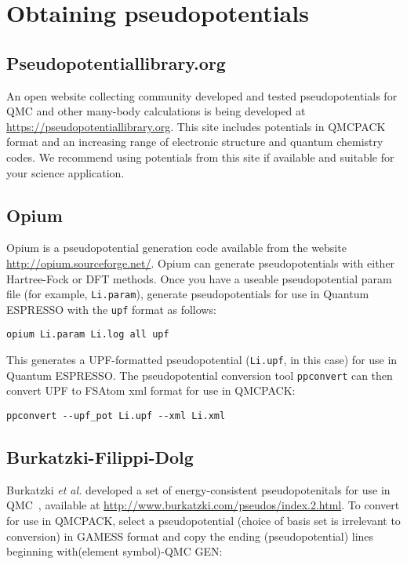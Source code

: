 \section{Obtaining pseudopotentials}

\subsection{Pseudopotentiallibrary.org}

An open website collecting community developed and tested
pseudopotentials for QMC and other many-body calculations is being
developed at \url{https://pseudopotentiallibrary.org}. This site
includes potentials in QMCPACK format and an increasing range of
electronic structure and quantum chemistry codes. We recommend using
potentials from this site if available and suitable for your science
application.

\subsection{Opium}
\label{subsec:opium}

Opium is a pseudopotential generation code available from the website \url{http://opium.sourceforge.net/}.  Opium can generate pseudopotentials with either Hartree-Fock or DFT methods.  Once you have a useable pseudopotential param file (for example, \texttt{Li.param}), generate pseudopotentials for use in Quantum ESPRESSO with the \texttt{upf} format as follows:
\begin{lstlisting}[caption=Generate UPF-formatted pseudopotential with Opium]
opium Li.param Li.log all upf
\end{lstlisting}
This generates a UPF-formatted pseudopotential (\texttt{Li.upf}, in this case) for use in Quantum ESPRESSO.  The pseudopotential conversion tool \texttt{ppconvert} can then convert UPF to FSAtom xml format for use in QMCPACK:
\begin{lstlisting}[caption=Convert UPF-formatted pseudopotential to FSAtom xml format]
ppconvert --upf_pot Li.upf --xml Li.xml
\end{lstlisting}

\subsection{Burkatzki-Filippi-Dolg}
\label{subsec:BFD}

Burkatzki \textit{et al.} developed a set of energy-consistent pseudopotenitals for use in QMC~\cite{Burkatzki07,Burkatzki08}, available at \url{http://www.burkatzki.com/pseudos/index.2.html}.  To convert for use in QMCPACK, select a pseudopotential (choice of basis set is irrelevant to conversion) in GAMESS format and copy the ending (pseudopotential) lines beginning with(element symbol)-QMC GEN:

